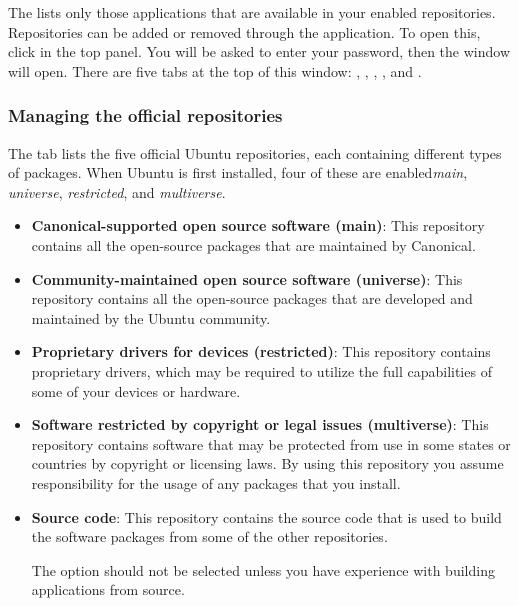 The  lists only those applications that are available in your enabled repositories. Repositories can be added or removed through the  application. 
To open this, click  in the top panel. You will be asked to enter your password, then the  window will open. There are five tabs at the top of this window: , , , , and .

\subsubsection{Managing the official repositories}

The  tab lists the five official Ubuntu repositories, each containing different types of packages. When Ubuntu is first installed, four of these are enabled\dash \emph{main}, \emph{universe}, \emph{restricted}, and \emph{multiverse}. 

\begin{itemize}
	\item \textbf{Canonical-supported open source software (main)}: This repository contains all the open-source packages that are maintained by \gls{Canonical}.
	\item \textbf{Community-maintained open source software (universe)}: This repository contains all the open-source packages that are developed and maintained by the Ubuntu community.
	\item \textbf{Proprietary drivers for devices (restricted)}:  This repository contains \gls{proprietary} drivers, which may be required to utilize the full capabilities of some of your devices or hardware. 
	\item \textbf{Software restricted by copyright or legal issues (multiverse)}: This repository contains software that may be protected from use in some states or countries by copyright or licensing laws. By using this repository you assume responsibility for the usage of any packages that you install.
	\item \textbf{Source code}: This repository contains the source code that is used to build the software packages from some of the other repositories.

The  option should not be selected unless you have experience with building applications from source.
\end{itemize}

